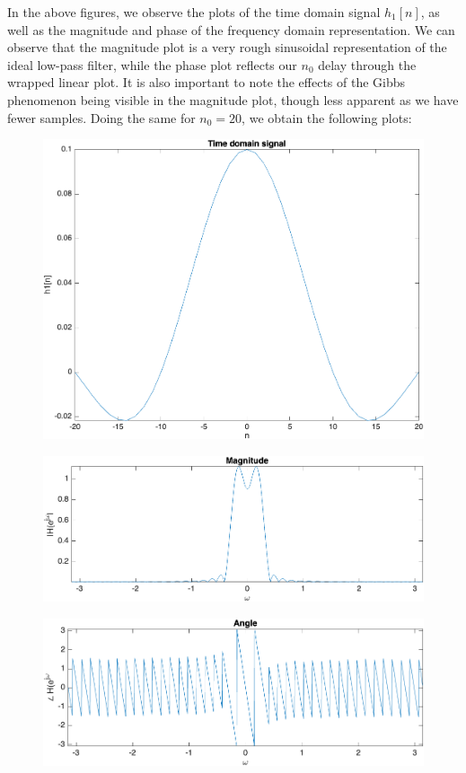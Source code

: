 \documentclass[12pt]{article}
\begin{document}
\begin{enumerate}[label=\textbf{\alph*)}, leftmargin=2.6em]
\begin{figure} [H]
\end{figure}
In the above figures, we observe the plots of the time domain signal $h_1[n]$, as well as the magnitude and phase of the frequency domain representation. We can observe that the magnitude plot is a very rough sinusoidal representation of the ideal low-pass filter, while the phase plot reflects our $n_0$ delay through the wrapped linear plot. It is also important to note the effects of the Gibbs phenomenon being visible in the magnitude plot, though less apparent as we have fewer samples. Doing the same for $n_0=20$, we obtain the following plots:
\begin{figure} [H]
    \centering
    \includegraphics[width=0.75\linewidth]{4.png}
\end{figure}
\begin{figure} [H]
    \centering
    \includegraphics[width=0.75\linewidth]{5.png}
\end{figure}
\begin{figure} [H]
    \centering
    \includegraphics[width=0.75\linewidth]{6.png}

\end{figure}
\end{enumerate}
\end{document}
